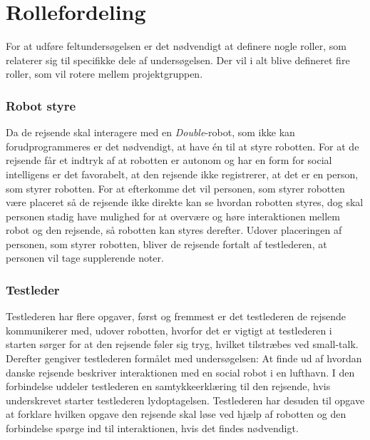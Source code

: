 \section{Rollefordeling}
\label{ParametreRollefordeling}
%
For at udføre feltundersøgelsen er det nødvendigt at definere nogle roller, som relaterer sig til specifikke dele af undersøgelsen. Der vil i alt blive defineret fire roller, som vil rotere mellem projektgruppen.
%
\subsubsection*{Robot styre}
Da de rejsende skal interagere med en \textit{Double}-robot, som ikke kan forudprogrammeres er det nødvendigt, at have én til at styre robotten. For at de rejsende får et indtryk af at robotten er autonom og har en form for social intelligens er det favorabelt, at den rejsende ikke registrerer, at det er en person, som styrer robotten. For at efterkomme det vil personen, som styrer robotten være placeret så de rejsende ikke direkte kan se hvordan robotten styres, dog skal personen stadig have mulighed for at overvære og høre interaktionen mellem robot og den rejsende, så robotten kan styres derefter. Udover placeringen af personen, som styrer robotten, bliver de rejsende fortalt af testlederen, at personen vil tage supplerende noter. 

\subsubsection*{Testleder}
Testlederen har flere opgaver, først og fremmest er det testlederen de rejsende kommunikerer med, udover robotten, hvorfor det er vigtigt at testlederen i starten sørger for at den rejsende føler sig tryg, hvilket tilstræbes ved small-talk. Derefter gengiver testlederen formålet med undersøgelsen: At finde ud af hvordan danske rejsende beskriver interaktionen med en social robot i en lufthavn. I den forbindelse uddeler testlederen en samtykkeerklæring til den rejsende, hvis underskrevet starter testlederen lydoptagelsen. Testlederen har desuden til opgave at forklare hvilken opgave den rejsende skal løse ved hjælp af robotten og den forbindelse spørge ind til interaktionen, hvis det findes nødvendigt.

